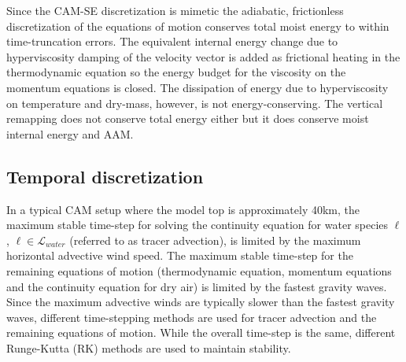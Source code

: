 \documentclass{agujournal}
\begin{document}
Since the CAM-SE discretization is mimetic the adiabatic, frictionless discretization of the equations of motion conserves total moist energy to within time-truncation errors. The equivalent internal energy change due to hyperviscosity damping of the velocity vector is added as frictional heating in the thermodynamic equation so the energy budget for the viscosity on the momentum equations is closed. The dissipation of energy due to hyperviscosity on temperature and dry-mass, however, is not energy-conserving. The vertical remapping does not conserve total energy either but it does conserve moist internal energy and AAM.



\subsection{Temporal discretization}
In a typical CAM setup where the model top is approximately 40km, the maximum stable time-step for solving the continuity equation for water species $\ell$, $\ell \in \mathcal{L}_{water}$ (referred to as tracer advection), is limited by the maximum horizontal advective wind speed. The maximum stable time-step for the remaining equations of motion (thermodynamic equation, momentum equations and the continuity equation for dry air) is limited by the fastest gravity waves.  Since the maximum advective winds are typically slower than the fastest gravity waves, different time-stepping methods are used for tracer advection and the remaining equations of motion. While the overall time-step is the same, different Runge-Kutta (RK) methods are used to maintain stability. 
\end{document}
